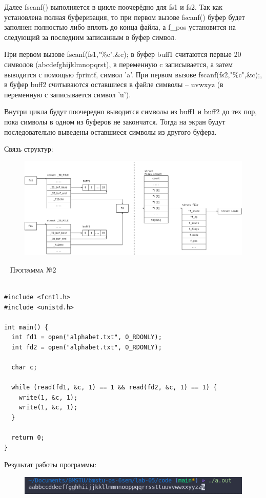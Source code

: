 Далее fscanf() выполняется в цикле поочерёдно для fs1 и  fs2. Так как установлена полная буферизация, то при первом вызове fscanf() буфер будет заполнен полностью либо вплоть до конца файла, а f\_pos установится на следующий за последним записанным в буфер символ.

При первом вызове fscanf(fs1,"\%c",\&c); в буфер buff1 считаются первые 20 символов (abcdefghijklmnopqrst), в переменную c записывается, а затем выводится с помощью fprintf, символ 'a'. При первом вызове fscanf(fs2,"\%c",\&c);, в буфер buff2 считываются оставшиеся в файле символы – uvwxyz (в переменную с записывается символ 'u').  

Внутри цикла будут поочередно выводится символы из buff1 и buff2 до тех пор, пока символы в одном из буферов не закончатся. Тогда на экран будут последовательно выведены оставшиеся символы из другого буфера. 

Связь структур:
\begin{figure}[H]
	\centering
	\includegraphics[scale=0.4]{assets/d_1.png}
\end{figure}

~\newline
\textsc{\huge Программа №2} \\
~\newline
\begin{lstlisting}
#include <fcntl.h>
#include <unistd.h>

int main() {
  int fd1 = open("alphabet.txt", O_RDONLY);
  int fd2 = open("alphabet.txt", O_RDONLY);

  char c;

  while (read(fd1, &c, 1) == 1 && read(fd2, &c, 1) == 1) {
    write(1, &c, 1);
    write(1, &c, 1);
  }

  return 0;
}
\end{lstlisting}
Результат работы программы:
\begin{figure}[H]
	\centering
	\includegraphics[scale=0.8]{assets/p_2.png}
\end{figure}

